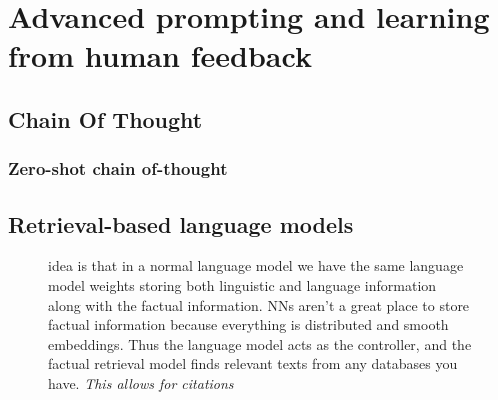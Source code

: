 \documentclass[11pt]{article}
\begin{document}
\section{Advanced prompting and learning from human feedback}

\subsection{Chain Of Thought}

\begin{figure}[H]
    \centering
\end{figure}

\subsubsection{Zero-shot chain of-thought}

\begin{figure}[H]
    \centering
\end{figure}   

\subsection{Retrieval-based language models}

\begin{figure}[H]
    \centering
    \caption*{idea is that in a normal language model we have the same language model weights storing both linguistic and language information along with the factual information. NNs aren't a great place to store factual information because everything is distributed and smooth embeddings. Thus the language model acts as the controller, and the factual retrieval model finds relevant texts from any databases you have. \emph{This allows for citations}}
\end{figure}
\end{document}
